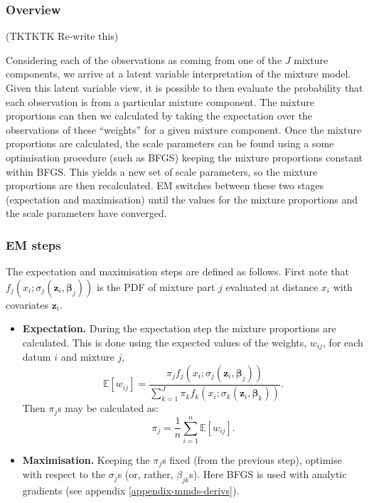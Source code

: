\subsubsection{Overview}

(TKTKTK Re-write this)

Considering each of the observations as coming from one of the $J$ mixture components, we arrive at a latent variable interpretation of the mixture model. Given this latent variable view, it is possible to then evaluate the probability that each observation is from a particular mixture component. The mixture proportions can then we calculated by taking the expectation over the observations of these ``weights'' for a given mixture component. Once the mixture proportions are calculated, the scale parameters can be found using a some optimisation procedure (such as BFGS) keeping the mixture proportions constant within BFGS. This yields a new set of scale parameters, so the mixture proportions are then recalculated. EM switches between these two stages (expectation and maximisation) until the values for the mixture proportions and the scale parameters have converged.

\subsubsection{EM steps}
The expectation and maximisation steps are defined as follows. First note that $f_j(x_i;\sigma_j(\bm{z}_i,\bm{\beta}_j))$ is the PDF of mixture part $j$ evaluated at distance $x_i$ with covariates $\bm{z}_i$. 


\begin{itemize}
\item \textbf{Expectation.}
During the expectation step the mixture proportions are calculated. This is done using the expected values of the weights, $w_{ij}$, for each datum $i$ and mixture $j$,
\begin{equation*}
\mathbb{E}[w_{ij}] = \frac{\pi_j f_j(x_i;\sigma_j(\bm{z}_i,\bm{\beta}_j))}{\sum_{k=1}^J \pi_k f_k(x_i;\sigma_k(\bm{z}_i,\bm{\beta}_k))}.
\end{equation*}
Then $\pi_j$s may be calculated as:
\begin{equation*}
\pi_j=\frac{1}{n} \sum_{i=1}^n \mathbb{E}[w_{ij}].
\end{equation*}

\item \textbf{Maximisation.}
Keeping the $\pi_j$s fixed (from the previous step), optimise with respect to the $\sigma_j$s (or, rather, $\beta_{jk}$s). Here BFGS is used with analytic gradients (see appendix \ref{appendix-mmds-derivs}). 
\end{itemize}



